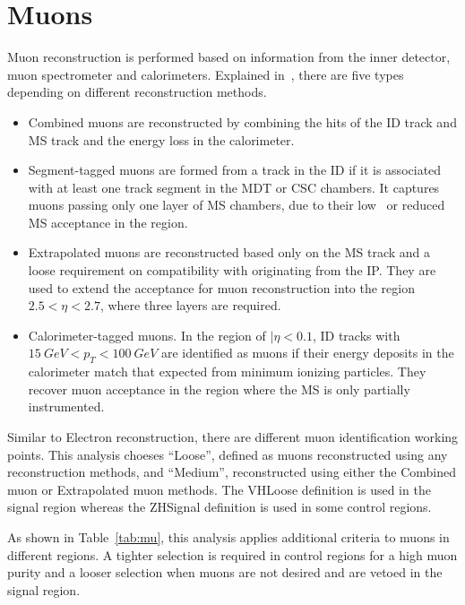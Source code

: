 \section{Muons}
\label{sec:mu}

\par Muon reconstruction is performed based on information from the inner detector, muon spectrometer and calorimeters. Explained in~\cite{Aad:2016jkr}, there are five types depending on different reconstruction methods.

\begin{itemize}
    \item Combined muons are reconstructed by combining the hits of the ID track and MS track and the energy loss in the calorimeter.
    \item Segment-tagged muons are formed from a track in the ID if it is associated with at least one track segment in the MDT or CSC chambers. It captures muons passing only one layer of MS chambers, due to their low \pt~or reduced MS acceptance in the region.
    \item Extrapolated muons are reconstructed based only on the MS track and a loose requirement on compatibility with originating from the IP. They are used to extend the acceptance for muon reconstruction into the region $2.5 <\eta< 2.7$, where three layers are required.
    \item Calorimeter-tagged muons. In the region of $|\eta< 0.1$, ID tracks with $15 ~GeV < p_T < 100 ~GeV$ are identified as muons if their energy deposits in the calorimeter match that expected from minimum ionizing particles. They recover muon acceptance in the region where the MS is only partially instrumented.
\end{itemize}

\par Similar to Electron reconstruction, there are different muon identification working points. This analysis choeses ``Loose'', defined as muons reconstructed using any reconstruction methods, and ``Medium'', reconstructed using either the Combined muon or Extrapolated muon methods. The VHLoose definition is used in the signal region whereas the ZHSignal definition is used in some control regions.					
\par As shown in Table~\ref{tab:mu}, this analysis applies additional criteria to muons in different regions. A tighter selection is required in control regions for a high muon purity and a looser selection when muons are not desired and are vetoed in the signal region.

